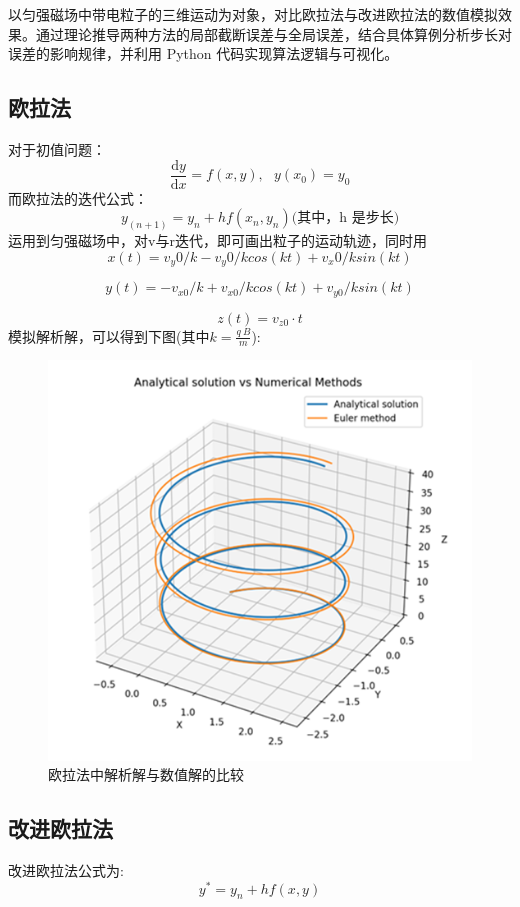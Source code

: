 \documentclass[11pt]{article}
\begin{document}
以匀强磁场中带电粒子的三维运动为对象，对比欧拉法与改进欧拉法的数值模拟效果。通过理论推导两种方法的局部截断误差与全局误差，结合具体算例分析步长对误差的影响规律，并利用 Python 代码实现算法逻辑与可视化。

\subsection{欧拉法}
对于初值问题：
\begin{equation*}
    \frac{\mathrm{d}y}{\mathrm{d}x}=f\left(x,y\right),\ \ \  y\left(x_0\right)=y_0
\end{equation*}
而欧拉法的迭代公式：
\begin{equation*}
y_{\left(n+1\right)}=y_n+hf\left(x_n,y_n\right)\mbox{(其中，h 是步长)}
\end{equation*}
运用到匀强磁场中，对v与r迭代，即可画出粒子的运动轨迹，同时用
\begin{equation*}
    x\left(t\right)=v_y0/k-v_y0/kcos{\left(kt\right)}+v_x0/ksin{\left(kt\right)}
\end{equation*}

\begin{equation*}
    y(t)=-v_{x0}/k+v_{x0}/kcos{(kt)}+v_{y0}/ksin{(kt)}
\end{equation*}

\begin{equation*}
    z\left(t\right)=v_{z0}\cdot t
\end{equation*}
模拟解析解，可以得到下图(其中$k=\frac{q\ B}{m}$):
\begin{figure}[h]
    \centering
    \includegraphics[width=0.5\linewidth]{Fig/Euler Method.png}
    \caption{欧拉法中解析解与数值解的比较}
    \label{fig:1}
\end{figure}


\subsection{改进欧拉法}
改进欧拉法公式为:
\begin{equation*}
    y^*=y_n+hf(x,y)
\end{equation*}
\end{document}
